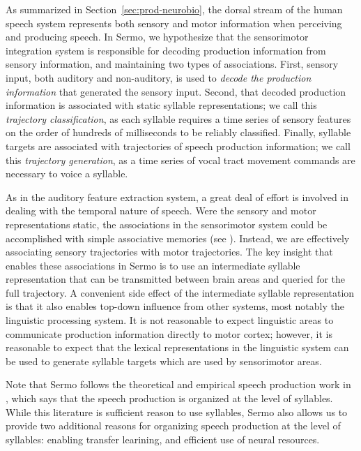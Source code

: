 
As summarized in Section~\ref{sec:prod-neurobio},
the dorsal stream of the human speech system
represents both sensory and motor information
when perceiving and producing speech.
In Sermo,
we hypothesize that
the sensorimotor integration system
is responsible for decoding production information
from sensory information,
and maintaining two types of associations.
First, sensory input,
both auditory and non-auditory,
is used to \textit{decode the production information}
that generated the sensory input.
Second, that decoded production information
is associated with
static syllable representations;
we call this \textit{trajectory classification},
as each syllable requires
a time series of sensory features
on the order of hundreds of milliseconds
to be reliably classified.
Finally, syllable targets are associated with
trajectories of speech production information;
we call this \textit{trajectory generation},
as a time series of vocal tract movement commands
are necessary to voice a syllable.

As in the auditory feature extraction system,
a great deal of effort is involved in
dealing with the temporal nature of speech.
Were the sensory and motor representations static,
the associations in the sensorimotor system
could be accomplished
with simple associative memories
(see \citealt{eliasmith2012,eliasmith2013}).
Instead, we are effectively associating
sensory trajectories with motor trajectories.
The key insight
that enables these associations in Sermo
is to use an intermediate syllable representation
that can be transmitted between
brain areas and queried
for the full trajectory.
A convenient side effect of
the intermediate syllable representation
is that it also enables
top-down influence from
other systems,
most notably the linguistic processing system.
It is not reasonable to expect
linguistic areas to communicate
production information directly
to motor cortex;
however, it is reasonable to expect
that the lexical representations
in the linguistic system
can be used to generate syllable targets
which are used by sensorimotor areas.

Note that Sermo follows
the theoretical and empirical
speech production work
in \citet{levelt1994,levelt1999,cholin2004},
which says that the
speech production is organized
at the level of syllables.
While this literature
is sufficient reason to use syllables,
Sermo also allows us to
provide two additional reasons
for organizing speech production
at the level of syllables:
enabling transfer learining,
and efficient use of neural resources.

